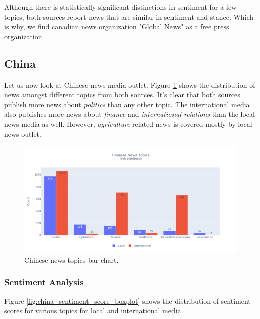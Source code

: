 \documentclass{article}
\theoremstyle{mytheoremstyle}
\theoremstyle{mytheoremstyle}
\theoremstyle{myproblemstyle}
\begin{document}
    Although there is statistically significant distinctions in sentiment for a few topics, both sources report news that are similar in sentiment and stance. Which is why, we find canadian news organization "Global News" as a free press organization.
    
    \subsection{China}

    Let us now look at Chinese news media outlet. Figure \ref{fig:china_topic} shows the distribution of news amongst different topics from both sources. It's clear that both sources publish more news about \emph{politics} than any other topic. The international media also publishes more news about \emph{finance} and \emph{international-relations} than the local news media as well. However, \emph{agriculture} related news is covered mostly by local news outlet.
    
    \begin{figure}[hp]
        \centering
        \includegraphics[width=\linewidth]{../images/plots/China/china_barchart_topics.png}
        \caption{Chinese news topics bar chart.}
        \label{fig:china_topic}
    \end{figure}

    \subsubsection{Sentiment Analysis}

    Figure \ref{fig:china_sentiment_score_boxplot} shows the distribution of sentiment scores for various topics for local and international media. 
    
\end{document}
